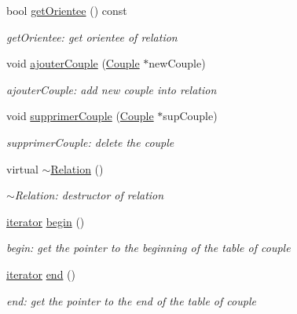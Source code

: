 \begin{DoxyCompactItemize}
bool \hyperlink{class_relation_a4a985197f794d8f2d0c9a6d21c2eae13}{get\+Orientee} () const
\begin{DoxyCompactList}\small\item\em get\+Orientee\+: get orientee of relation \end{DoxyCompactList}\item 
void \hyperlink{class_relation_a9209a870df1bf2fc04e3803b3432cae7}{ajouter\+Couple} (\hyperlink{class_couple}{Couple} $\ast$new\+Couple)
\begin{DoxyCompactList}\small\item\em ajouter\+Couple\+: add new couple into relation \end{DoxyCompactList}\item 
void \hyperlink{class_relation_ac8e3f82f4d5afc302b4ee0f1641ba548}{supprimer\+Couple} (\hyperlink{class_couple}{Couple} $\ast$sup\+Couple)
\begin{DoxyCompactList}\small\item\em supprimer\+Couple\+: delete the couple \end{DoxyCompactList}\item 
virtual \hyperlink{class_relation_aac587ec926df3043c3eedcb5123be50b}{$\sim$\+Relation} ()
\begin{DoxyCompactList}\small\item\em $\sim$\+Relation\+: destructor of relation \end{DoxyCompactList}\item 
\hyperlink{class_relation_1_1iterator}{iterator} \hyperlink{class_relation_aa436b19e8361edc4de25b7b30b3bd010}{begin} ()
\begin{DoxyCompactList}\small\item\em begin\+: get the pointer to the beginning of the table of couple \end{DoxyCompactList}\item 
\hyperlink{class_relation_1_1iterator}{iterator} \hyperlink{class_relation_aee4ecfac883dc307d257d6976e7a191b}{end} ()
\begin{DoxyCompactList}\small\item\em end\+: get the pointer to the end of the table of couple \end{DoxyCompactList}\end{DoxyCompactItemize}

